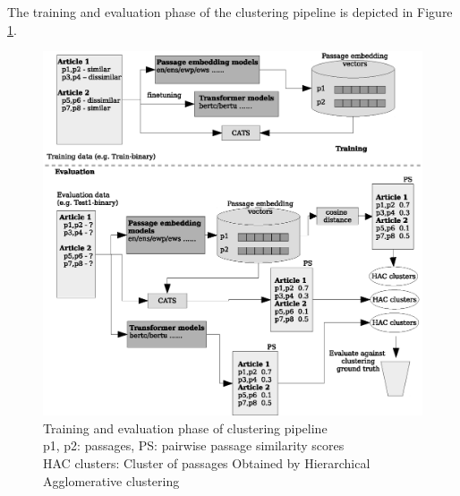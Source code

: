 The training and evaluation phase of the clustering pipeline is depicted in Figure \ref{fig:pipe}.
\begin{figure}[h]
  \centering
  \includegraphics[width=\linewidth]{graphics/pipeline.eps}
  \caption{Training and evaluation phase of clustering pipeline \\
  p1, p2: passages, PS: pairwise passage similarity scores \\
  HAC clusters: Cluster of passages Obtained by Hierarchical Agglomerative clustering}
  \label{fig:pipe}
\end{figure}

